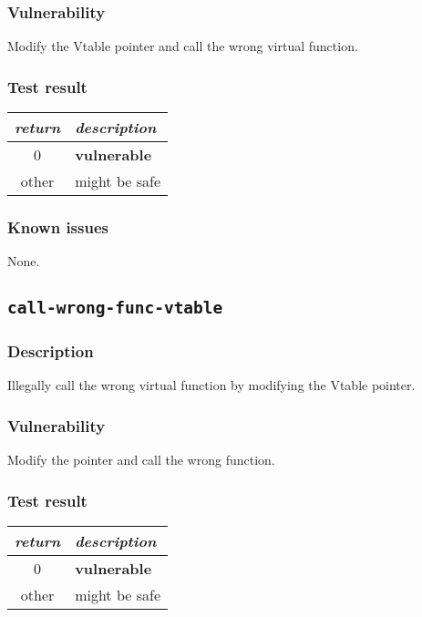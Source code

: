 \documentclass[a4paper]{book}
\begin{document}
\subsubsection{Vulnerability}
Modify the Vtable pointer and call the wrong virtual function.

\subsubsection{Test result}
\begin{tabular}{cl}
  \toprule
  \emph{return}  & \emph{description} \\
  \midrule
  0              & \textbf{vulnerable} \\
  other          & might be safe \\
  \bottomrule
\end{tabular}
  
\subsubsection{Known issues}
None.

\newpage

\subsection{\texttt{call-wrong-func-vtable}}\label{test-call-wrong-func-vtable}

\subsubsection{Description}
Illegally call the wrong virtual function by modifying the Vtable pointer.
\subsubsection{Vulnerability}
Modify the pointer and call the wrong function.

\subsubsection{Test result}
\begin{tabular}{cl}
  \toprule
  \emph{return}  & \emph{description} \\
  \midrule
  0              & \textbf{vulnerable} \\
  other          & might be safe \\
  \bottomrule
\end{tabular}
  
\end{document}
